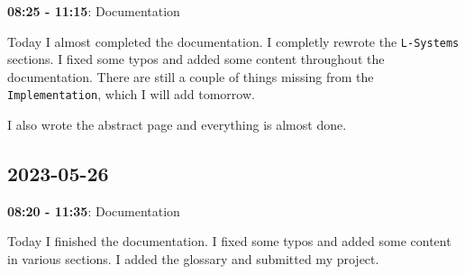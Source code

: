 \documentclass{article}
\begin{document}
\textbf{08:25 - 11:15}: Documentation

Today I almost completed the documentation. I completly rewrote the \texttt{L-Systems}
sections. I fixed some typos and added some content throughout the documentation.
There are still a couple of things missing from the \texttt{Implementation},
which I will add tomorrow.

I also wrote the abstract page and everything is almost done.

\subsection{2023-05-26}

\textbf{08:20 - 11:35}: Documentation

Today I finished the documentation.
I fixed some typos and added some content in various sections.
I added the glossary and submitted my project.
\end{document}
